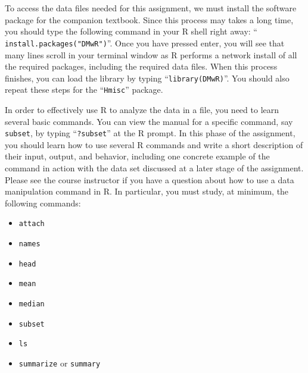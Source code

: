 To access the data files needed for this assignment, we must install the software package for the companion textbook.
Since this process may takes a long time, you should type the following command in your R shell right away: ``{\tt
  install.packages("DMwR")}''. Once you have pressed enter, you will see that many lines scroll in your terminal window
as R performs a network install of all the required packages, including the required data files.  When this process
finishes, you can load the library by typing ``{\tt library(DMwR)}''. You should also repeat these steps for the
``{\tt Hmisc}'' package.

In order to effectively use R to analyze the data in a file, you need to learn several basic commands. You can view the
manual for a specific command, say {\tt subset}, by typing ``{\tt ?subset}'' at the R prompt. In this phase of the
assignment, you should learn how to use several R commands and write a short description of their input, output, and
behavior, including one concrete example of the command in action with the data set discussed at a later stage of the
assignment. Please see the course instructor if you have a question about how to use a data manipulation command in R.
In particular, you must study, at minimum, the following commands:

\begin{itemize}
    \itemsep0pt
  \item {\tt attach}
  \item {\tt names}
  \item {\tt head}
  \item {\tt mean}
  \item {\tt median}
  \item {\tt subset}
  \item {\tt ls}
  \item {\tt summarize} or {\tt summary}
\end{itemize}


